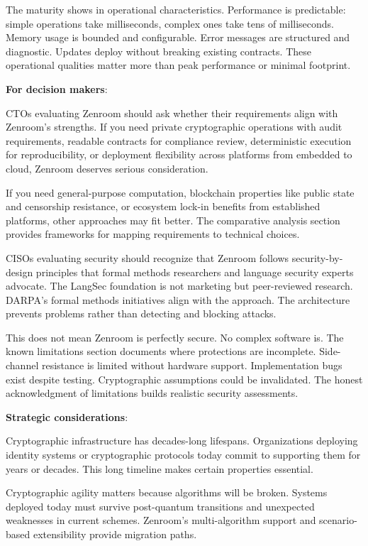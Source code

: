 The maturity shows in operational characteristics. Performance is
predictable: simple operations take milliseconds, complex ones take
tens of milliseconds. Memory usage is bounded and configurable. Error
messages are structured and diagnostic. Updates deploy without
breaking existing contracts. These operational qualities matter more
than peak performance or minimal footprint.

\textbf{For decision makers}:

CTOs evaluating Zenroom should ask whether their requirements align
with Zenroom's strengths. If you need private cryptographic operations
with audit requirements, readable contracts for compliance review,
deterministic execution for reproducibility, or deployment flexibility
across platforms from embedded to cloud, Zenroom deserves serious
consideration.

If you need general-purpose computation, blockchain properties like
public state and censorship resistance, or ecosystem lock-in benefits
from established platforms, other approaches may fit better. The
comparative analysis section provides frameworks for mapping
requirements to technical choices.

CISOs evaluating security should recognize that Zenroom follows
security-by-design principles that formal methods researchers and
language security experts advocate. The LangSec foundation is not
marketing but peer-reviewed research. DARPA's formal methods
initiatives align with the approach. The architecture prevents
problems rather than detecting and blocking attacks.

This does not mean Zenroom is perfectly secure. No complex software
is. The known limitations section documents where protections are
incomplete. Side-channel resistance is limited without hardware
support. Implementation bugs exist despite testing. Cryptographic
assumptions could be invalidated. The honest acknowledgment of
limitations builds realistic security assessments.

\textbf{Strategic considerations}:

Cryptographic infrastructure has decades-long lifespans. Organizations
deploying identity systems or cryptographic protocols today commit to
supporting them for years or decades. This long timeline makes certain
properties essential.

Cryptographic agility matters because algorithms will be
broken. Systems deployed today must survive post-quantum transitions
and unexpected weaknesses in current schemes. Zenroom's
multi-algorithm support and scenario-based extensibility provide
migration paths.

